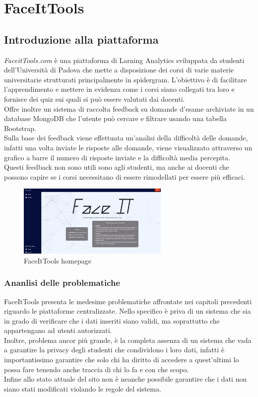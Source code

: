 \chapter{FaceItTools}
\section{Introduzione alla piattaforma}
\textit{FaceitTools.com} è una piattaforma di Larning Analytics sviluppata da studenti dell'Università di Padova che mette a disposizione dei corsi di varie materie universitarie strutturati principalmente in spidergram.
L'obiettivo è di facilitare l'apprendimento e mettere in evidenza come i corsi siano collegati tra loro e fornisce dei quiz sui quali si può essere valutati dai docenti.
\\Offre inoltre un sistema di raccolta feedback su domande d'esame archiviate in un database MongoDB che l’utente può cercare e filtrare usando una tabella Bootstrap.
\\Sulla base dei feedback viene effettuata un'analisi della difficoltà delle domande, infatti una volta inviate le risposte alle domande, viene visualizzato attraverso un grafico a barre il numero di risposte inviate e la difficoltà media percepita.
\\Questi feedback non sono utili sono agli studenti, ma anche ai docenti che possono capire se i corsi necessitano di essere rimodellati per essere più efficaci.
\begin{figure}[h]
    \centering
    \includegraphics[width=0.65\textwidth]{Immagini/FaceItTools.PNG}
    \caption{FaceItTools homepage}
\end{figure}
\subsection{Ananlisi delle problematiche}
FaceItTools presenta le medesime problematiche affrontate nei capitoli precedenti riguardo le piattaforme centralizzate.
Nello specifico è priva di un sistema che sia in grado di verificare che i dati inseriti siano validi, ma soprattutto che appartengano ad utenti autorizzati.
\\Inoltre, problema ancor più grande, è la completa assenza di un sistema che vada a garantire la privacy degli studenti che condividono i loro dati, 
infatti è importantissimo garantire che solo chi ha diritto di accedere a quest'ultimi lo possa fare tenendo anche traccia di chi lo fa e con che scopo.
\\Infine allo stato attuale del sito non è neanche possibile garantire che i dati non siano stati modificati violando le regole del sistema.

